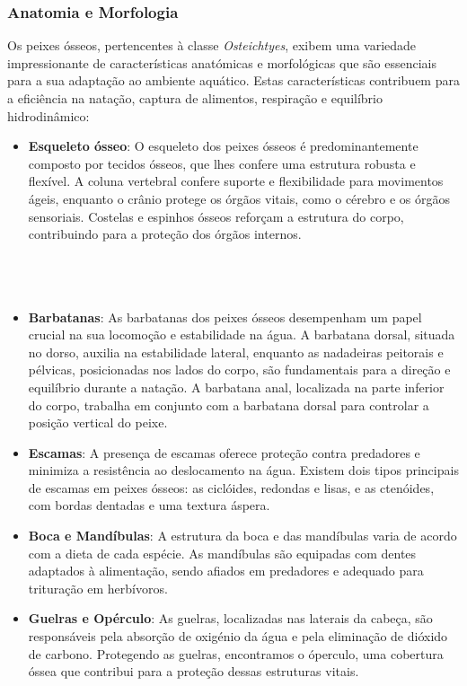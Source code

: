 \documentclass{report}
\begin{document}
\subsubsection{Anatomia e Morfologia}
Os peixes ósseos, pertencentes à classe \textit{Osteichtyes}, exibem uma variedade impressionante de características anatómicas e morfológicas que são essenciais para a sua adaptação ao ambiente aquático. Estas características contribuem para a eficiência na natação, captura de alimentos, respiração e equilíbrio hidrodinâmico:
\begin{itemize}
	\item \textbf{Esqueleto ósseo}: O esqueleto dos peixes ósseos é predominantemente composto por tecidos ósseos, que lhes confere uma estrutura robusta e flexível. A coluna vertebral confere suporte e flexibilidade para movimentos ágeis, enquanto o crânio protege os órgãos vitais, como o cérebro e os órgãos sensoriais. Costelas e espinhos ósseos reforçam a estrutura do corpo, contribuindo para a proteção dos órgãos internos.
\\
\\
\\
\\
	\item \textbf{Barbatanas}: As barbatanas dos peixes ósseos desempenham um papel crucial na sua locomoção e estabilidade na água. A barbatana dorsal, situada no dorso, auxilia na estabilidade lateral, enquanto as nadadeiras peitorais e pélvicas, posicionadas nos lados do corpo, são fundamentais para a direção e equilíbrio durante a natação. A barbatana anal, localizada na parte inferior do corpo, trabalha em conjunto com a barbatana dorsal para controlar a posição vertical do peixe.
	
	\item \textbf{Escamas}: A presença de escamas oferece proteção contra predadores e minimiza a resistência ao deslocamento na água. Existem dois tipos principais de escamas em peixes ósseos: as ciclóides, redondas e lisas, e as ctenóides, com bordas dentadas e uma textura áspera.
	
	\item \textbf{Boca e Mandíbulas}: A estrutura da boca e das mandíbulas varia de acordo com a dieta de cada espécie. As mandíbulas são equipadas com dentes adaptados à alimentação, sendo afiados em predadores e adequado para trituração em herbívoros.
	
	\item \textbf{Guelras e Opérculo}: As guelras, localizadas nas laterais da cabeça, são responsáveis pela absorção de oxigénio da água e pela eliminação de dióxido de carbono. Protegendo as guelras, encontramos o óperculo, uma cobertura óssea que contribui para a proteção dessas estruturas vitais.
\end{itemize}
\end{document}
